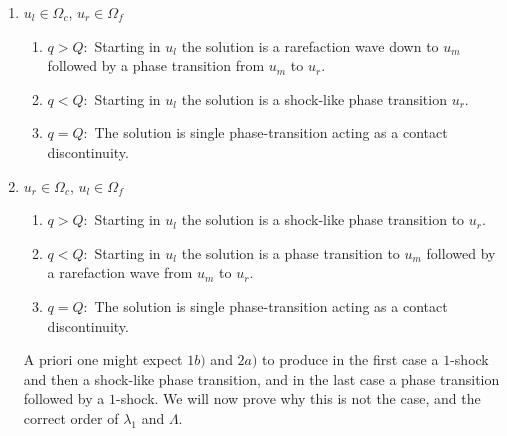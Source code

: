 \documentclass[10pt]{article}
\numberwithin{equation}{section}
\begin{document}
\begin{enumerate}
\item $u_l \in \Omega_c$, $u_r \in \Omega_f$ \newline
\newline
  \begin{minipage}[t]{0.4\linewidth}
    \begin{enumerate}
    \item $q > Q:$ Starting in $u_l$ the solution is a rarefaction wave down to $u_m$ followed by a phase transition  from $u_m$ to $u_r$.
    \item $q < Q:$ Starting in $u_l$ the solution is a shock-like phase transition $u_r$.
    \item $q = Q:$ The solution is single phase-transition acting as a contact discontinuity.
    \end{enumerate}
  \end{minipage}
  \begin{minipage}[t]{0.5\linewidth}
    \centering
    \strut\vspace*{-\baselineskip}\newline
  \end{minipage}
\item $u_r \in \Omega_c$, $u_l \in \Omega_f$ \newline
\newline
  \begin{minipage}[t]{0.4\linewidth}
    \begin{enumerate}
    \item $q > Q:$ Starting in $u_l$ the solution is a shock-like phase transition to $u_r$.
    \item $q < Q:$ Starting in $u_l$ the solution is a phase transition to $u_m$ followed by a rarefaction wave from $u_m$ to $u_r$.
    \item $q = Q:$ The solution is single phase-transition acting as a contact discontinuity.
    \end{enumerate}
  \end{minipage}
  \begin{minipage}[t]{0.5\linewidth}
    \centering
    \strut\vspace*{-\baselineskip}\newline
  \end{minipage}
  

A priori one might expect $1b)$ and $2a)$ to produce in the first case a $1$-shock and then a shock-like phase transition, and in the last case a phase transition followed by a $1$-shock. We will now prove why this is not the case, and the correct order of $\lambda_1$ and $\Lambda$. 


\end{enumerate}
\end{document}
